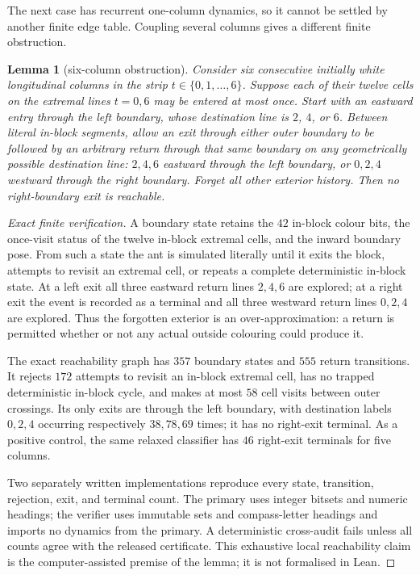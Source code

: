 \documentclass[11pt,letterpaper]{article}
\theoremstyle{plain}
\newtheorem{lemma}[theorem]{Lemma}
\theoremstyle{definition}
\begin{document}
\begin{NoHyper}
The next case has recurrent one-column dynamics, so it cannot be settled by another
finite edge table.  Coupling several columns gives a different finite obstruction.

\begin{lemma}[six-column obstruction]\label{lem:width6block}
Consider six consecutive initially white longitudinal columns in the strip
$t\in\{0,1,\ldots,6\}$.  Suppose each of their twelve cells on the extremal lines
$t=0,6$ may be entered at most once.  Start with an eastward entry through the left
boundary, whose destination line is $2$, $4$, or $6$.  Between literal in-block
segments, allow an exit through either outer boundary to be followed by an arbitrary
return through that same boundary on any geometrically possible destination line:
$2,4,6$ eastward through the left boundary, or $0,2,4$ westward through the right
boundary.  Forget all other exterior history.  Then no right-boundary exit is
reachable.
\end{lemma}

\begin{proof}[Exact finite verification]
A boundary state retains the $42$ in-block colour bits, the once-visit status of the
twelve in-block extremal cells, and the inward boundary pose.  From such a state the
ant is simulated literally until it exits the block, attempts to revisit an
extremal cell, or repeats a complete deterministic in-block state.  At a left exit
all three eastward return lines $2,4,6$ are explored; at a right exit the event is
recorded as a terminal and all three westward return lines $0,2,4$ are explored.
Thus the forgotten exterior is an over-approximation: a return is permitted whether
or not any actual outside colouring could produce it.

The exact reachability graph has $357$ boundary states and $555$ return transitions.
It rejects $172$ attempts to revisit an in-block extremal cell, has no trapped
deterministic in-block cycle, and makes at most $58$ cell visits between outer
crossings.  Its only exits are through the left boundary, with destination labels
$0,2,4$ occurring respectively $38,78,69$ times; it has no right-exit terminal.
As a positive control, the same relaxed classifier has $46$ right-exit terminals
for five columns.

Two separately written implementations reproduce every state, transition,
rejection, exit, and terminal count.  The primary uses integer bitsets and numeric
headings; the verifier uses immutable sets and compass-letter headings and imports
no dynamics from the primary.  A deterministic cross-audit fails unless all counts
agree with the released certificate.  This exhaustive local reachability claim is
the computer-assisted premise of the lemma; it is not formalised in Lean.
\end{proof}


\end{NoHyper}
\end{document}
